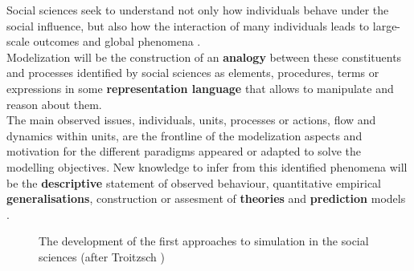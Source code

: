\documentclass[11pt,oneside,a4paper,openright]{report}
\begin{document}
Social sciences seek to understand not only how individuals behave under the social influence, but also how the interaction of 
many individuals leads to large-scale outcomes and global phenomena \cite[p.9]{GordonBurt2010}.\\ 
Modelization will be the construction of an \textbf{analogy} between these constituents and processes identified by social sciences as elements, procedures, terms or expressions in some \textbf{representation language} that allows to manipulate and reason about them.\\  
The main observed issues, individuals, units, processes or actions, flow and dynamics within units, are the frontline of the 
modelization aspects and motivation for the different paradigms appeared or adapted to solve the modelling objectives. New 
knowledge to infer from this identified phenomena will be the \textbf{descriptive} statement of observed behaviour, quantitative 
empirical \textbf{generalisations}, construction or assesment of \textbf{theories} and \textbf{prediction} models \cite[p.9-53]{Coleman1964}.


\begin{figure}[h]
\centering
\setlength\fboxsep{0pt}
\setlength\fboxrule{0.5pt}
\caption{The development of the first approaches to simulation in the social sciences (after Troitzsch \cite{GilbertTroitzsch})}
\label{fig:SimAppGilbTro}
\end{figure}

\end{document}
